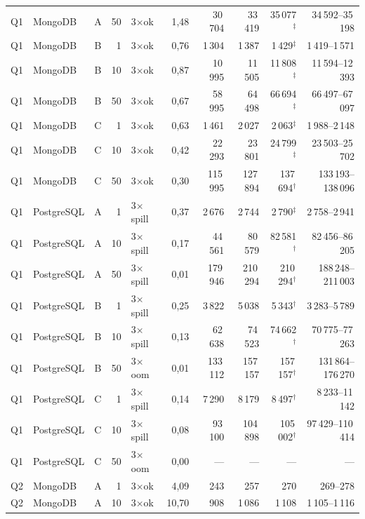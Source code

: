 \begin{longtable}{llcrlrrrrr}
Q1 & MongoDB & A & 50 & 3$\times$ok & 1{,}48 & 30\,704 & 33\,419 & 35\,077$^{\ddagger}$ & 34\,592--35\,198 \\
Q1 & MongoDB & B & 1 & 3$\times$ok & 0{,}76 & 1\,304 & 1\,387 & 1\,429$^{\ddagger}$ & 1\,419--1\,571 \\
Q1 & MongoDB & B & 10 & 3$\times$ok & 0{,}87 & 10\,995 & 11\,505 & 11\,808$^{\ddagger}$ & 11\,594--12\,393 \\
Q1 & MongoDB & B & 50 & 3$\times$ok & 0{,}67 & 58\,995 & 64\,498 & 66\,694$^{\ddagger}$ & 66\,497--67\,097 \\
Q1 & MongoDB & C & 1 & 3$\times$ok & 0{,}63 & 1\,461 & 2\,027 & 2\,063$^{\ddagger}$ & 1\,988--2\,148 \\
Q1 & MongoDB & C & 10 & 3$\times$ok & 0{,}42 & 22\,293 & 23\,801 & 24\,799$^{\ddagger}$ & 23\,503--25\,702 \\
Q1 & MongoDB & C & 50 & 3$\times$ok & 0{,}30 & 115\,995 & 127\,894 & 137\,694$^{\dagger}$ & 133\,193--138\,096 \\
\addlinespace
Q1 & PostgreSQL & A & 1 & 3$\times$spill & 0{,}37 & 2\,676 & 2\,744 & 2\,790$^{\ddagger}$ & 2\,758--2\,941 \\
Q1 & PostgreSQL & A & 10 & 3$\times$spill & 0{,}17 & 44\,561 & 80\,579 & 82\,581$^{\dagger}$ & 82\,456--86\,205 \\
Q1 & PostgreSQL & A & 50 & 3$\times$spill & 0{,}01 & 179\,946 & 210\,294 & 210\,294$^{\dagger}$ & 188\,248--211\,003 \\
Q1 & PostgreSQL & B & 1 & 3$\times$spill & 0{,}25 & 3\,822 & 5\,038 & 5\,343$^{\dagger}$ & 3\,283--5\,789 \\
Q1 & PostgreSQL & B & 10 & 3$\times$spill & 0{,}13 & 62\,638 & 74\,523 & 74\,662$^{\dagger}$ & 70\,775--77\,263 \\
Q1 & PostgreSQL & B & 50 & 3$\times$oom & 0{,}01 & 133\,112 & 157\,157 & 157\,157$^{\dagger}$ & 131\,864--176\,270 \\
Q1 & PostgreSQL & C & 1 & 3$\times$spill & 0{,}14 & 7\,290 & 8\,179 & 8\,497$^{\dagger}$ & 8\,233--11\,142 \\
Q1 & PostgreSQL & C & 10 & 3$\times$spill & 0{,}08 & 93\,100 & 104\,898 & 105\,002$^{\dagger}$ & 97\,429--110\,414 \\
Q1 & PostgreSQL & C & 50 & 3$\times$oom & 0{,}00 & --- & --- & --- & --- \\
\addlinespace
Q2 & MongoDB & A & 1 & 3$\times$ok & 4{,}09 & 243 & 257 & 270 & 269--278 \\
Q2 & MongoDB & A & 10 & 3$\times$ok & 10{,}70 & 908 & 1\,086 & 1\,108 & 1\,105--1\,116 \\

\end{longtable}
